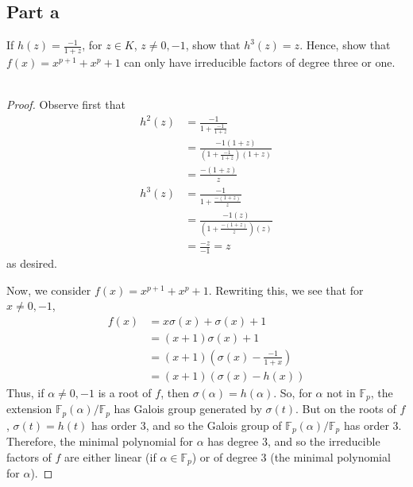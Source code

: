 \documentclass[12pt,reqno]{amsart}
\newcommand{\F}{\mathbb{F}}
\begin{document}
\subsection*{Part a}
If $h(z) = \frac{-1}{1+z}$, for $z\in K$, $z\neq 0,-1$, show that $h^3(z) = z$.
Hence, show that $f(x) = x^{p+1} + x^p + 1$ can only have irreducible factors of
degree three or one.
\\
\\
\begin{proof}
    Observe first that
    \[
\begin{aligned}
    h^2(z) &= \frac{-1}{1+\frac{-1}{1+z}}\\
    &=\frac{-1(1+z)}{(1+\frac{-1}{1+z})(1+z)}\\
    &= \frac{-(1+z)}{z}\\
    h^3(z) &= \frac{-1}{1+\frac{-(1+z)}{z}}\\
    &= \frac{-1(z)}{(1+\frac{-(1+z)}{z})(z)}\\
    &=\frac{-z}{-1} = z
\end{aligned}
    \]
    as desired.

    Now, we consider $f(x) = x^{p+1} + x^p + 1$. Rewriting this, we see that for
    $x\neq 0,-1$,
    \[
        \begin{aligned}
        f(x) &= x\sigma(x) + \sigma(x) + 1\\
        &=(x+1)\sigma(x) + 1\\
        &=(x+1)(\sigma(x) - \frac{-1}{1+x})\\
        &=(x+1)(\sigma(x) - h(x))
    \end{aligned}
    \]
    Thus, if $\alpha\neq 0,-1$ is a root of $f$, then $\sigma(\alpha) =
    h(\alpha)$. So, for $\alpha$ not in $\F_p$, the extension
    $\F_p(\alpha)/\F_p$ has Galois group generated by $\sigma(t)$. But on the
    roots of $f$, $\sigma(t) = h(t)$ has order $3$, and so the Galois group of
    $\F_p(\alpha)/\F_p$ has order $3$. Therefore, the minimal polynomial for
    $\alpha$ has degree $3$, and so the irreducible factors of $f$ are either
    linear (if $\alpha\in \F_p$) or of degree $3$ (the minimal polynomial for
        $\alpha$).
\end{proof}
\end{document}
